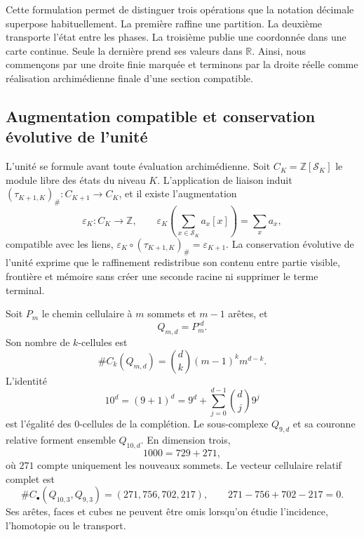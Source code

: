 Cette formulation permet de distinguer trois opérations que la notation décimale
superpose habituellement. La première raffine une partition. La deuxième transporte
l'état entre les phases. La troisième publie une coordonnée dans une carte continue.
Seule la dernière prend ses valeurs dans \(\mathbb R\). Ainsi, nous commençons par une droite
finie marquée et terminons par la droite réelle comme réalisation archimédienne
finale d'une section compatible.

\subsection*{Augmentation compatible et conservation évolutive de l'unité}

L'unité se formule avant toute évaluation archimédienne. Soit
\(C_K=\mathbb Z[\mathcal S_K]\) le module libre des états du niveau
\(K\). L'application de liaison induit
\((\tau_{K+1,K})_\#:C_{K+1}\to C_K\), et il existe l'augmentation
\[
 \varepsilon_K:C_K\longrightarrow\mathbb Z,\qquad
 \varepsilon_K\!\left(\sum_{x\in\mathcal S_K}a_x[x]\right)=\sum_xa_x,
\]
compatible avec les liens,
\(\varepsilon_K\circ(\tau_{K+1,K})_\#=\varepsilon_{K+1}\). La conservation évolutive
de l'unité exprime que le raffinement redistribue son contenu entre
partie visible, frontière et mémoire sans créer une seconde racine ni supprimer le
terme terminal.

Soit \(P_m\) le chemin cellulaire à \(m\) sommets et \(m-1\) arêtes, et
\[
 Q_{m,d}=P_m^{\square d}.
\]
Son nombre de \(k\)-cellules est
\begin{equation}\label{p12-83-c0-s1:eq:horizonte-celdas-cubicas}
 \#C_k(Q_{m,d})=\binom dk(m-1)^k m^{d-k}.
\end{equation}
L’identité
\begin{equation}\label{p12-83-c0-s1:eq:horizonte-completacion-binomial}
 10^d=(9+1)^d
     =9^d+\sum_{j=0}^{d-1}\binom dj9^j
\end{equation}
est l'égalité des \(0\)-cellules de la complétion. Le sous-complexe
\(Q_{9,d}\) et sa couronne relative forment ensemble \(Q_{10,d}\). En dimension
trois,
\[
 1000=729+271,
\]
où \(271\) compte uniquement les nouveaux sommets. Le vecteur cellulaire
relatif complet est
\begin{equation}\label{p12-83-c0-s1:eq:horizonte-corona-relativa}
 \#C_\bullet(Q_{10,3},Q_{9,3})=(271,756,702,217),
 \qquad 271-756+702-217=0.
\end{equation}
Ses arêtes, faces et cubes ne peuvent être omis lorsqu'on étudie l'incidence,
l'homotopie ou le transport.

